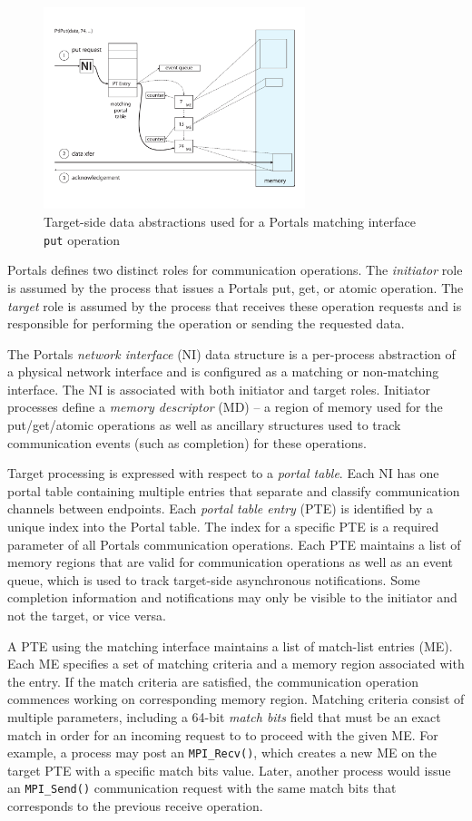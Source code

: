 \begin{figure}[ht]
  \centering
  \includegraphics[width=3in]{figs/portals_put}
  \caption{Target-side data abstractions used for a Portals matching interface {\tt put} operation}
  \label{fig:portals_put}
\end{figure}

Portals defines two distinct roles for communication operations. The {\em
  initiator} role is assumed by the process that issues a Portals put, get, or
atomic operation. The {\em target} role is assumed by the process that receives
these operation requests and is responsible for performing the operation or
sending the requested data.

The Portals {\em network interface} (NI) data structure is a per-process
abstraction of a physical network interface and is configured as a
matching or non-matching interface. The NI is associated with both
initiator and target roles. Initiator processes define a {\em memory
  descriptor} (MD) -- a region of memory used for the put/get/atomic
operations as well as ancillary structures used to track communication
events (such as completion) for these operations.

Target processing is expressed with respect to a {\em portal table}. Each NI has one portal 
table containing multiple entries that separate and
classify communication channels between endpoints.  Each {\em portal table
  entry} (PTE) is identified by a unique index into the Portal table. The index
for a specific PTE is a required parameter of all Portals communication
operations. Each PTE maintains a list of memory regions that are valid for
communication operations as well as an event queue, which is used to track
target-side asynchronous notifications.  Some completion information and
notifications may only be visible to the initiator and not the target, or vice
versa.

A PTE using the matching interface maintains a list of match-list entries (ME).
Each ME specifies a set of matching criteria and a memory region associated
with the entry. If the match criteria are satisfied, the communication
operation commences working on corresponding memory region. Matching criteria
consist of multiple parameters, including a 64-bit {\em match bits} field
that must be an exact match in order for an incoming request to to proceed
with the given ME. For example, a process may post an {\tt MPI\_Recv()}, which
creates a new ME on the target PTE with a specific match bits value. Later,
another process would issue an {\tt MPI\_Send()} communication request with
the same match bits that corresponds to the previous receive operation.


